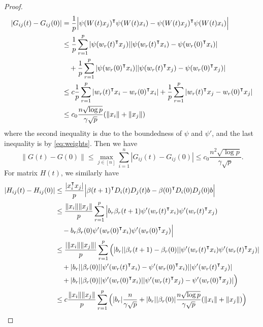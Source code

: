 \begin{proof}
\begin{equation*}
\begin{aligned}
    |G_{ij}(t) - G_{ij}(0)|
    & = \frac{1}{p}\Big|\psi(W(t)x_j)\transpose\psi(W(t)x_i) -\psi(W(t)x_j)\transpose\psi(W(t)x_i)\Big| \\
    & \leq \frac{1}{p} \sum_{r=1}^p |\psi(w_r(t)\transpose x_j)||\psi(w_r(t)\transpose x_i)-\psi(w_r(0)\transpose x_i)| \\
    &\quad + \frac{1}{p} \sum_{r=1}^p |\psi(w_r(0)\transpose x_i)||\psi(w_r(t)\transpose x_j)-\psi(w_r(0)\transpose x_j)| \\
    &\leq c \frac{1}{p} \sum_{r=1}^p|w_r(t)\transpose x_i-w_r(0)\transpose x_i| + \frac{1}{p} \sum_{r=1}^p|w_r(t)\transpose x_j-w_r(0)\transpose x_j| \\
    &\leq c_0 \frac{n\sqrt{\log p}}{\gamma\sqrt p} (\|x_i\|+\|x_j\|)
\end{aligned}
\end{equation*}
where the second inequality is due to the boundedness of $\psi$ and $\psi'$, and the last inequality is by \eqref{eq:weights}. Then we have
\begin{equation}\label{eq:bound_Gt}
    \|G(t)-G(0)\| \leq \max_{j \in [n]}\sum_{i=1}^n|G_{ij}(t) - G_{ij}(0)| \leq c_0 \frac{n^2\sqrt{\log p}}{\gamma\sqrt p}.
\end{equation}
For matrix $H(t)$, we similarly have
\begin{equation*}
\begin{aligned}
    |H_{ij}(t)-H_{ij}(0)|
    &\leq \frac{|x_i\transpose x_j|}{p}\Big|\beta(t+1)\transpose D_i(t)D_j(t)b - \beta(0)\transpose D_i(0)D_j(0)b\Big| \\
    &\leq \frac{\|x_i\|\|x_j\|}{p}\sum_{r=1}^p \Big|b_r\beta_r(t+1)\psi'(w_r(t)\transpose x_i)\psi'(w_r(t)\transpose x_j)\\
    &\quad -b_r\beta_r(0)\psi'(w_r(0)\transpose x_i)\psi'(w_r(0)\transpose x_j)\Big| \\
    &\leq \frac{|\|x_i\|\|x_j\||}{p}\sum_{r=1}^p\Big(|b_r||\beta_r(t+1)-\beta_r(0)| |\psi'(w_r(t)\transpose x_i)\psi'(w_r(t)\transpose x_j)|\\
    & \quad +|b_r||\beta_r(0)| |\psi'(w_r(t)\transpose x_i)-\psi'(w_r(0)\transpose x_i)| |\psi'(w_r(t)\transpose x_j)|\\
    & \quad +|b_r||\beta_r(0)| |\psi'(w_r(0)\transpose x_i)| |\psi'(w_r(t)\transpose x_j)-\psi'(w_r(0)\transpose x_j)| \Big)\\
    &\leq c\frac{\|x_i\|\|x_j\|}{p}\sum_{r=1}^p\Big(|b_r|\frac{n}{\gamma\sqrt p} + |b_r||\beta_r(0)|\frac{n\sqrt{\log p}}{\gamma\sqrt p} (\|x_i\|+\|x_j\|)\Big) \\

\end{aligned}
\end{equation*}
\end{proof}
